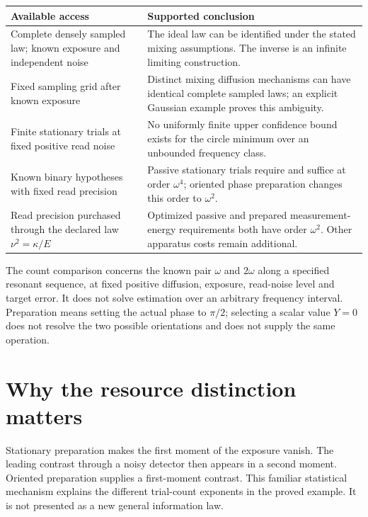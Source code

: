 \begin{center}
\begin{tabular}{p{}p{}}
\toprule
Available access & Supported conclusion\\
\midrule
Complete densely sampled law; known exposure and independent noise &
The ideal law can be identified under the stated mixing assumptions.
The inverse is an infinite limiting construction.\\[3pt]
Fixed sampling grid after known exposure &
Distinct mixing diffusion mechanisms can have identical complete sampled
laws; an explicit Gaussian example proves this ambiguity.\\[3pt]
Finite stationary trials at fixed positive read noise &
No uniformly finite upper confidence bound exists for the circle minimum
over an unbounded frequency class.\\[3pt]
Known binary hypotheses with fixed read precision &
Passive stationary trials require and suffice at order $\omega^4$;
oriented phase preparation changes this order to $\omega^2$.\\[3pt]
Read precision purchased through the declared law $\nu^2=\kappa/E$ &
Optimized passive and prepared measurement-energy requirements both have
order $\omega^2$. Other apparatus costs remain additional.\\
\bottomrule
\end{tabular}
\end{center}

The count comparison concerns the known pair $\omega$ and $2\omega$
along a specified resonant sequence, at fixed positive diffusion, exposure,
read-noise level and target error. It does not solve estimation over an
arbitrary frequency interval. Preparation means setting the actual phase
to $\pi/2$; selecting a scalar value $Y=0$ does not resolve the two possible
orientations and does not supply the same operation.

\section{Why the resource distinction matters}

Stationary preparation makes the first moment of the exposure vanish.
The leading contrast through a noisy detector then appears in a second
moment. Oriented preparation supplies a first-moment contrast. This familiar
statistical mechanism explains the different trial-count exponents in the
proved example. It is not presented as a new general information law.

